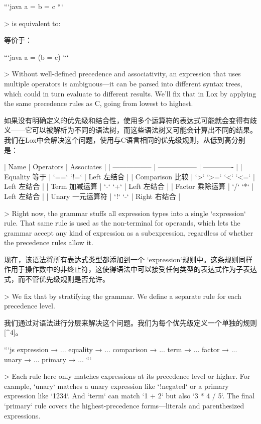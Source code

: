 \documentclass[cn,11pt,chinese]{elegantbook}
\begin{document}
  ```java
  a = b = c
  ```

  > is equivalent to:

  等价于：

  ```java
  a = (b = c)
  ```

> Without well-defined precedence and associativity, an expression that uses multiple operators is ambiguous—it can be parsed into different syntax trees, which could in turn evaluate to different results. We’ll fix that in Lox by applying the same precedence rules as C, going from lowest to highest.

如果没有明确定义的优先级和结合性，使用多个运算符的表达式可能就会变得有歧义——它可以被解析为不同的语法树，而这些语法树又可能会计算出不同的结果。我们在Lox中会解决这个问题，使用与C语言相同的优先级规则，从低到高分别是：

| Name              | Operators         | Associates    |
| ----------------- | ----------------- | ------------- |
| Equality  等于    | `==` `!=`         | Left  左结合  |
| Comparison  比较  | `>` `>=` `<` `<=` | Left  左结合  |
| Term  加减运算    | `-` `+`           | Left  左结合  |
| Factor   乘除运算 | `/` `*`           | Left  左结合  |
| Unary  一元运算符 | `!` `-`           | Right  右结合 |

> Right now, the grammar stuffs all expression types into a single `expression` rule. That same rule is used as the non-terminal for operands, which lets the grammar accept any kind of expression as a subexpression, regardless of whether the precedence rules allow it.

现在，该语法将所有表达式类型都添加到一个 `expression`规则中。这条规则同样作用于操作数中的非终止符，这使得语法中可以接受任何类型的表达式作为子表达式，而不管优先级规则是否允许。

> We fix that by stratifying the grammar. We define a separate rule for each precedence level.

我们通过对语法进行分层来解决这个问题。我们为每个优先级定义一个单独的规则[^4]。

```js
expression     → ...
equality       → ...
comparison     → ...
term           → ...
factor         → ...
unary          → ...
primary        → ...
```

> Each rule here only matches expressions at its precedence level or higher. For example, `unary` matches a unary expression like `!negated` or a primary expression like `1234`. And `term` can match `1 + 2` but also `3 * 4 / 5`. The final `primary` rule covers the highest-precedence forms—literals and parenthesized expressions.
\end{document}
